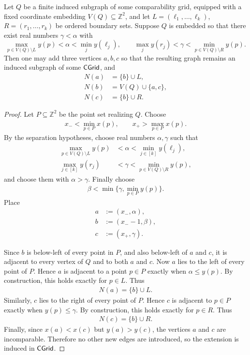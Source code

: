 \begin{lemma}
\label{lem:middle-all-connected-extension}
Let \(Q\) be a finite induced subgraph of some comparability grid, equipped with
a fixed coordinate embedding \(V(Q)\subseteq \mathbb Z^2\), and let
\(L=(\ell_1,\ldots,\ell_k)\), \(R=(r_1,\ldots,r_k)\) be ordered boundary sets.
Suppose \(Q\) is embedded so that there exist real numbers \(\gamma<\alpha\)
with
\[
\max_{p\in V(Q)\setminus L}y(p)<\alpha<\min_{j}y(\ell_j),
\qquad
\max_j y(r_j)<\gamma<\min_{p\in V(Q)\setminus R}y(p).
\]
Then one may add three vertices \(a,b,c\) so that the resulting graph remains
an induced subgraph of some \(\mathsf{CGrid}\), and
\begin{align}
    N(a)
    &=
    \{b\}\cup L,\\
    N(b)
    &=
    V(Q)\cup\{a,c\},\\
    N(c)
    &=
    \{b\}\cup R.
\end{align}
\end{lemma}

\begin{proof}
Let \(P\subseteq\mathbb Z^2\) be the point set realizing \(Q\). Choose
\begin{align}
    x_-<\min_{p\in P}x(p),
    \qquad
    x_+>\max_{p\in P}x(p).
\end{align}
By the separation hypotheses, choose real numbers \(\alpha,\gamma\) such that
\begin{align}
    \max_{p\in V(Q)\setminus L} y(p)
    &<
    \alpha
    <
    \min_{j\in[k]} y(\ell_j),\\
    \max_{j\in[k]} y(r_j)
    &<
    \gamma
    <
    \min_{p\in V(Q)\setminus R} y(p),
\end{align}
and choose them with \(\alpha>\gamma\). Finally choose
\begin{align}
    \beta
    <
    \min\{\gamma,\min_{p\in P}y(p)\}.
\end{align}
Place
\begin{align}
    a&:=(x_-,\alpha),\\
    b&:=(x_- -1,\beta),\\
    c&:=(x_+,\gamma).
\end{align}

Since \(b\) is below-left of every point in \(P\), and also below-left of
\(a\) and \(c\), it is adjacent to every vertex of \(Q\) and to both \(a\)
and \(c\). Now \(a\) lies to the left of every point of \(P\). Hence \(a\) is adjacent to
a point \(p\in P\) exactly when \(\alpha\leq y(p)\). By construction, this
holds exactly for \(p\in L\). Thus
\begin{align}
    N(a)=\{b\}\cup L.
\end{align}
Similarly, \(c\) lies to the right of every point of \(P\). Hence \(c\) is
adjacent to \(p\in P\) exactly when \(y(p)\leq \gamma\). By construction, this
holds exactly for \(p\in R\). Thus
\begin{align}
    N(c)=\{b\}\cup R.
\end{align}
Finally, since \(x(a)<x(c)\) but \(y(a)>y(c)\), the vertices \(a\) and \(c\)
are incomparable. Therefore no other new edges are introduced, so the
extension is induced in \(\mathsf{CGrid}\).
\end{proof}

